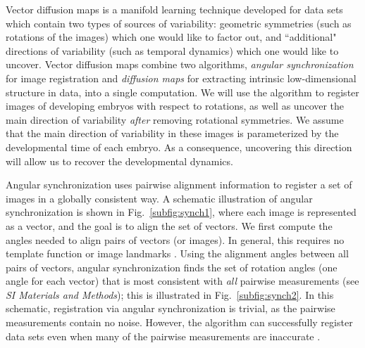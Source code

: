\documentclass{pnastwo}
\newcommand{\SI}[0]{{\it SI Materials and Methods}}
\newcommand{\fig}[0]{Fig.}
\begin{document}
\begin{article}
Vector diffusion maps \cite{singer2012vector} is a manifold learning
technique developed for data sets which contain two types of sources of variability:
geometric symmetries (such as rotations of the images) which one would like to factor out,
and ``additional" directions of variability (such as temporal dynamics) which one would like to uncover.
%
Vector diffusion maps combine two algorithms, {\em angular synchronization} \cite{singer2011angular} for image registration and {\em diffusion maps} \cite{coifman2005geometric} for extracting intrinsic low-dimensional structure in data, into a single computation.
%
We will use the algorithm to register images of developing embryos with respect to rotations, as well as uncover the main direction of variability {\it after} removing rotational symmetries.
%
We assume that the main direction of variability in these images is parameterized by the developmental time of each embryo.
%
As a consequence, uncovering this direction will allow us to recover the developmental dynamics.

Angular synchronization uses pairwise alignment information to register a set of images in a globally consistent way.
%
A schematic illustration of angular synchronization is shown in \fig~\ref{subfig:synch1}, where each image is represented as a vector, and the goal is to align the set of vectors.
%
We first compute the angles needed to align pairs of vectors (or images).  
%
In general, this requires no template function \cite{ahuja2007template} or image landmarks \cite{ian1998statistical}.
%
Using the alignment angles between all pairs of vectors, angular synchronization finds the set of rotation angles (one angle for each vector) that is most consistent with {\it all} pairwise measurements (see \SI); this is illustrated in \fig~\ref{subfig:synch2}.
%
In this schematic, registration via angular synchronization is trivial, as the pairwise measurements contain no noise.
%
However, the algorithm can successfully register data sets even when many of the pairwise measurements are inaccurate \cite{singer2011angular}.


\end{article}
\end{document}

